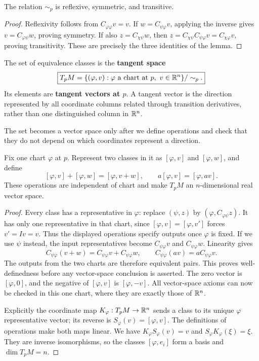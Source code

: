 \begin{proposition}
The relation $\sim_p$ is reflexive, symmetric, and transitive.
\end{proposition}
\begin{proof}
Reflexivity follows from $C_{\varphi\varphi}v=v$.
If $w=C_{\psi\varphi}v$, applying the inverse gives
$v=C_{\varphi\psi}w$, proving symmetry. If also $z=C_{\chi\psi}w$,
then $z=C_{\chi\psi}C_{\psi\varphi}v=C_{\chi\varphi}v$, proving
transitivity. These are precisely the three identities of the lemma.
\end{proof}
\begin{definition}
The set of equivalence classes is the \textbf{tangent space}
\[
\boxed{T_pM=\{(\varphi,v):\varphi\text{ a chart at }p,\ v\in\mathbb{R}^n\}/\sim_p.}
\]
Its elements are \textbf{tangent vectors at $p$}. A tangent vector is
the direction represented by all coordinate columns related through
transition derivatives, rather than one distinguished column in $\mathbb{R}^n$.
\end{definition}
The set becomes a vector space only after we define operations and check
that they do not depend on which coordinates represent a direction.

\begin{theorem}\label{thm:tangent-space}
Fix one chart $\varphi$ at $p$. Represent two classes in it as
$[\varphi,v]$ and $[\varphi,w]$, and define
\[
[\varphi,v]+[\varphi,w]=[\varphi,v+w],\qquad
a[\varphi,v]=[\varphi,av].
\]
These operations are independent of chart and make $T_pM$ an
$n$-dimensional real vector space.
\end{theorem}
\begin{proof}
Every class has a representative in $\varphi$: replace $(\psi,z)$ by
$(\varphi,C_{\varphi\psi}z)$. It has only one representative in that
chart, since $[\varphi,v]=[\varphi,v']$ forces $v'=Iv=v$.
Thus the displayed operations specify outputs once $\varphi$ is fixed.
If we use $\psi$ instead, the input representatives become
$C_{\psi\varphi}v$ and $C_{\psi\varphi}w$. Linearity gives
\[
C_{\psi\varphi}(v+w)=C_{\psi\varphi}v+C_{\psi\varphi}w,
\qquad C_{\psi\varphi}(av)=aC_{\psi\varphi}v.
\]
The outputs from the two charts are therefore equivalent pairs. This proves
well-definedness before any vector-space conclusion is asserted.
The zero vector is $[\varphi,0]$, and the negative of $[\varphi,v]$ is
$[\varphi,-v]$. All vector-space axioms can now be checked in this one
chart, where they are exactly those of $\mathbb{R}^n$.

Explicitly the coordinate map $K_\varphi:T_pM\to\mathbb{R}^n$ sends a
class to its unique $\varphi$ representative vector; its reverse is
$S_\varphi(v)=[\varphi,v]$. The definitions of operations make both maps
linear. We have $K_\varphi S_\varphi(v)=v$ and
$S_\varphi K_\varphi(\xi)=\xi$. They are inverse isomorphisms,
so the classes $[\varphi,e_i]$ form a basis and $\dim T_pM=n$.
\end{proof}

